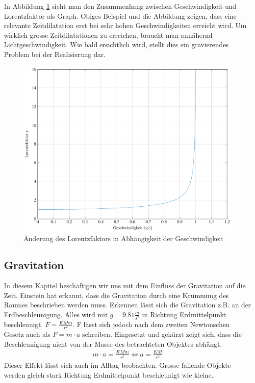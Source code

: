 \begin{refsection}
In Abbildung \ref{skript:zeitreisen:fig:lorentz} sieht man den Zusammenhang zwischen Geschwindigkeit und Lorentzfaktor als Graph. Obiges Beispiel und die Abbildung zeigen, dass eine relevante Zeitdilatation erst bei sehr hohen Geschwindigkeiten erreicht wird. Um wirklich grosse Zeitdilatationen zu erreichen, braucht man annähernd Lichtgeschwindigkeit. Wie bald ersichtlich wird, stellt dies ein gravierendes Problem bei der Realisierung dar.
\begin{figure}[H]
   \centering
   \includegraphics[width=12cm]{zeitreisen/tikz/lorentz.pdf}
   \caption{Änderung des Lorentzfaktors in Abh\"angigkeit der Geschwindigkeit}
   \label{skript:zeitreisen:fig:lorentz} 
\end{figure}
\subsection{Gravitation} \label{Gravitation}

	In diesem Kapitel beschäftigen wir uns mit dem Einfluss der Gravitation auf die Zeit. Einstein hat erkannt, dass die Gravitation durch eine Krümmung des Raumes beschrieben werden muss. Erkennen lässt sich die Gravitation z.B. an der Erdbeschleunigung. Alles wird mit $g=9.81\frac{m}{s^2}$ in Richtung Erdmittelpunkt beschleunigt. $F=\frac{KMm}{r^2}$. F lässt sich jedoch nach dem zweiten Newtonschen Gesetz auch als $F=m\cdot a$ schreiben. Eingesetzt und gekürzt zeigt sich, dass die Beschleunigung nicht von der Masse des betrachteten Objektes abhängt.
	\begin{align*}
		m\cdot a = \frac{KMm}{r^2} \Leftrightarrow a=\frac{KM}{r^2} 
	\end{align*}
	Dieser Effekt lässt sich auch im Alltag beobachten. Grosse fallende Objekte werden gleich stark Richtung Erdmittelpunkt beschleunigt wie kleine.
	

\end{refsection}
